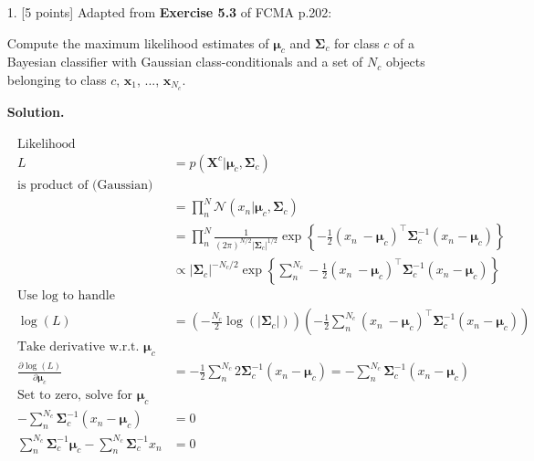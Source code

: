 \documentclass[10pt]{article}
\begin{document}
\newpage
\begin{itemize}

\item[1.]  [5 points]  %
Adapted from {\bf Exercise 5.3} of FCMA p.202:

Compute the maximum likelihood estimates of $\boldsymbol{\mu}_c$ and $\boldsymbol{\Sigma}_c$ for class $c$ of a Bayesian classifier with Gaussian class-conditionals and a set of $N_c$ objects belonging to class $c$, $\mathbf{x}_1$, ..., $\mathbf{x}_{N_c}$. 

{\bf Solution.} 

\begin{eqnarray*}
\begin{aligned}
%
%
\text{Likelihood}
\\
L &= p(\mathbf{X}^c|\boldsymbol{\mu}_c, \boldsymbol{\Sigma}_c)
\\
\text{is product of (Gaussian) probabilities}
\\
&= \prod_n^N \mathcal{N} (x_n|\boldsymbol{\mu}_c, \boldsymbol{\Sigma}_c)
\\
&= \prod_n^N 
\frac{1}{(2 \pi)^{N/2} | \boldsymbol {\Sigma}_c |^{1/2}} 
\exp 
\left\{ 
-\frac{1}{2} (x_n\ - \boldsymbol {\mu}_c)^\top \boldsymbol {\Sigma}_c^{-1} (x_n - \boldsymbol {\mu}_c)
\right\}
\\
&\propto 
|\boldsymbol {\Sigma}_c|^{-{N_c}/2}
\exp 
\left\{ 
\sum_n^{N_c} -\frac{1}{2} (x_n\ - \boldsymbol {\mu}_c)^\top \boldsymbol {\Sigma}_c^{-1} (x_n - \boldsymbol {\mu}_c)
\right\}
\\
% 
%
\text{Use log to handle exponent}
\\
\log(L) &= 
\left( - \frac{N_c}{2} \log(|\boldsymbol {\Sigma}_c|) \right)
\left(
-\frac{1}{2} \sum_n^{N_c} (x_n\ - \boldsymbol {\mu}_c)^\top \boldsymbol {\Sigma}_c^{-1} (x_n - \boldsymbol {\mu}_c)
\right)
\\
%
%
\text{Take derivative w.r.t. $\boldsymbol \mu_c$}
\\
\frac{\partial \log(L)}{\partial \boldsymbol \mu_c} 
&= -\frac{1}{2} \sum_n^{N_c} 2 \boldsymbol {\Sigma}_c^{-1} (x_n - \boldsymbol {\mu}_c) 
= - \sum_n^{N_c} \boldsymbol {\Sigma}_c^{-1} (x_n - \boldsymbol {\mu}_c) 
\\
\text{Set to zero, solve for $\boldsymbol \mu_c$}
\\
- \sum_n^{N_c} \boldsymbol {\Sigma}_c^{-1} (x_n - \boldsymbol {\mu}_c) &= 0
\\
\sum_n^{N_c} \boldsymbol {\Sigma}_c^{-1} \boldsymbol {\mu}_c - \sum_n^{N_c} \boldsymbol {\Sigma}_c^{-1} x_n  &= 0

\end{aligned}
\end{eqnarray*}
\end{itemize}
\end{document}
